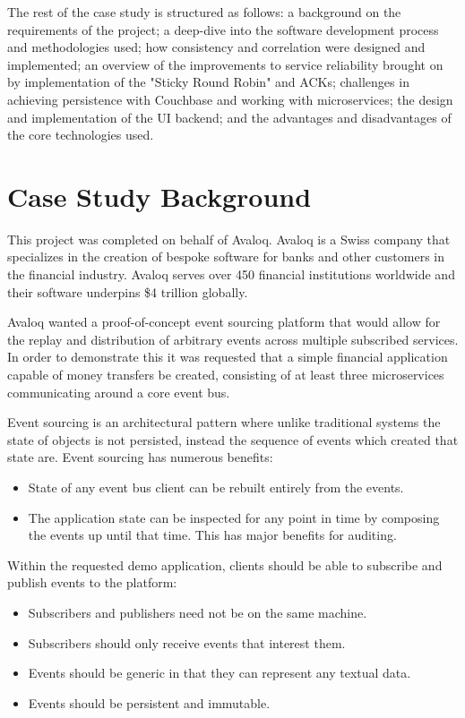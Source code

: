 \documentclass{l3proj}
\begin{document}
The rest of the case study is structured as follows: a background on the requirements of the project; a deep-dive into the software development process and methodologies used; how consistency and correlation were designed and implemented; an overview of the improvements to service reliability brought on by implementation of the "Sticky Round Robin" and ACKs; challenges in achieving persistence with Couchbase and working with microservices; the design and implementation of the UI backend; and the advantages and disadvantages of the core technologies used.

\section{Case Study Background}
\label{sec:background}
This project was completed on behalf of Avaloq. Avaloq is a Swiss company that specializes in the creation of bespoke software for banks and other customers in the financial industry. Avaloq serves over 450 financial institutions worldwide and their software underpins \$4 trillion globally.

Avaloq wanted a proof-of-concept event sourcing platform that would allow for the replay and distribution of arbitrary events across multiple subscribed services. In order to demonstrate this it was requested that a simple financial application capable of money transfers be created, consisting of at least three microservices communicating around a core event bus.

Event sourcing is an architectural pattern where unlike traditional systems the state of objects is not persisted, instead the sequence of events which created that state are. Event sourcing has numerous benefits:

\begin{itemize}
    \item State of any event bus client can be rebuilt entirely from the events.
    \item The application state can be inspected for any point in time by composing the events up until that time. This has major benefits for auditing.
\end{itemize}


Within the requested demo application, clients should be able to subscribe and publish events to the platform:

\begin{itemize}
    \item Subscribers and publishers need not be on the same machine.
    \item Subscribers should only receive events that interest them.
    \item Events should be generic in that they can represent any textual data.
    \item Events should be persistent and immutable.
\end{itemize}
\end{document}
